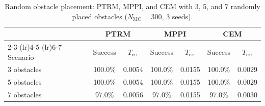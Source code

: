 \begin{table}[t]
\centering
\caption{Random obstacle placement: PTRM, MPPI, and CEM with 3, 5, and 7 randomly placed obstacles ($N_{\mathrm{MC}}=300$, 3 seeds).}
\label{tab:random_obstacles}
\begin{tabular}{lcccccc}
\toprule
& \multicolumn{2}{c}{PTRM} & \multicolumn{2}{c}{MPPI} & \multicolumn{2}{c}{CEM} \\
\cmidrule(lr){2-3} \cmidrule(lr){4-5} \cmidrule(lr){6-7}
Scenario & Success & $T_{\mathrm{err}}$ & Success & $T_{\mathrm{err}}$ & Success & $T_{\mathrm{err}}$ \\
\midrule
  3 obstacles & 100.0\% & 0.0054 & 100.0\% & 0.0155 & 100.0\% & 0.0029 \\
  5 obstacles & 100.0\% & 0.0054 & 100.0\% & 0.0155 & 100.0\% & 0.0029 \\
  7 obstacles & 97.0\% & 0.0056 & 97.0\% & 0.0155 & 97.0\% & 0.0030 \\
\bottomrule
\end{tabular}
\end{table}
